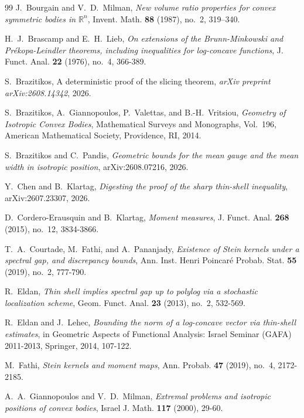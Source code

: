 \documentclass[12pt]{article}
\theoremstyle{definition}
\theoremstyle{remark}
\begin{document}
\begin{thebibliography}{99}
J.~Bourgain and V.~D.~Milman,
\emph{New volume ratio properties for convex symmetric bodies in
$\mathbb R^n$},
Invent. Math. \textbf{88} (1987), no.~2, 319--340.


H.~J.~Brascamp and E.~H.~Lieb,
\emph{On extensions of the Brunn-Minkowski and Pr\'ekopa-Leindler theorems, including inequalities for log-concave functions},
J. Funct. Anal. \textbf{22} (1976), no.~4, 366-389.

S.~Brazitikos,
\newblock A deterministic proof of the slicing theorem,
\newblock \emph{arXiv preprint arXiv:2608.14342}, 2026.

S.~Brazitikos, A.~Giannopoulos, P.~Valettas, and B.-H.~Vritsiou,
\emph{Geometry of Isotropic Convex Bodies},
Mathematical Surveys and Monographs, Vol.~196,
American Mathematical Society, Providence, RI, 2014.

S.~Brazitikos and C.~Pandis,
\emph{Geometric bounds for the mean gauge and the mean width in
isotropic position},
arXiv:2608.07216, 2026.


Y.~Chen and B.~Klartag,
\emph{Digesting the proof of the sharp thin-shell inequality},
arXiv:2607.23307, 2026.

D.~Cordero-Erausquin and B.~Klartag,
\emph{Moment measures},
J. Funct. Anal. \textbf{268} (2015), no.~12, 3834-3866.

T.~A.~Courtade, M.~Fathi, and A.~Pananjady,
\emph{Existence of Stein kernels under a spectral gap, and discrepancy bounds},
Ann. Inst. Henri Poincar\'e Probab. Stat. \textbf{55} (2019), no.~2, 777-790.

R.~Eldan,
\emph{Thin shell implies spectral gap up to polylog via a stochastic localization scheme},
Geom. Funct. Anal. \textbf{23} (2013), no.~2, 532-569.

R.~Eldan and J.~Lehec,
\emph{Bounding the norm of a log-concave vector via thin-shell estimates},
in Geometric Aspects of Functional Analysis: Israel Seminar (GAFA) 2011-2013,
Springer, 2014, 107-122.

M.~Fathi,
\emph{Stein kernels and moment maps},
Ann. Probab. \textbf{47} (2019), no.~4, 2172-2185.

A.~A.~Giannopoulos and V.~D.~Milman,
\emph{Extremal problems and isotropic positions of convex bodies},
Israel J. Math. \textbf{117} (2000), 29-60.


\end{thebibliography}
\end{document}
